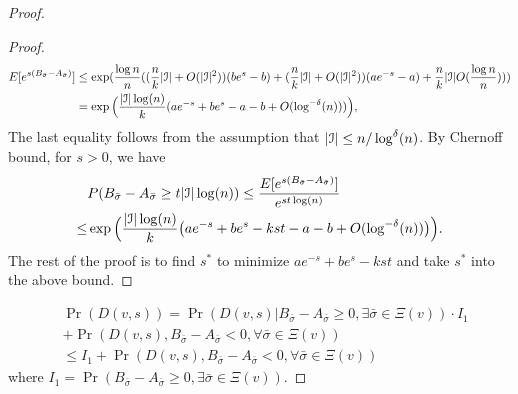 \documentclass{article}
\begin{document}
\begin{proof}
\begin{proof}
	\begin{align*}
	E[e^{s(B_{\bar{\sigma}}-A_{\bar{\sigma}})}] & \le
	\exp(\frac{\log n}{n}((\frac{n}{k}|\mathcal{I}| + O(|\mathcal{I}|^2))(be^s - b) +(\frac{n}{k} |\mathcal{I}| + O(|\mathcal{I}|^2))(ae^{-s}-a) + \frac{n}{k}|\mathcal{I}|O(\frac{\log n}{n}) ))
	 \\
	& =
	\exp\Big(\frac{|\mathcal{I}| \log(n)}{k}(a e^{-s}+b e^s-a-b +
	O(\log^{-\delta}(n))) \Big),
	\end{align*}
	The last equality follows from the assumption that $ |\mathcal{I}| \le n/\log^{\delta}(n)$.
	By Chernoff bound, for $s>0$, we have
	\begin{align*} 
	& P(B_{\bar{\sigma}}-A_{\bar{\sigma}}\ge t |\mathcal{I}| \log(n))\le
	\frac{E[e^{s(B_{\bar{\sigma}}-A_{\bar{\sigma}})}]}{e^{st \log(n)}}  \\
	\le & \exp\Big(\frac{|\mathcal{I}|\log(n)}{k} \big(a e^{-s}+b e^s -kst -a-b
	+ O(\log^{-\delta}(n)) \big)\Big)  .
	\end{align*}
	The rest of the proof is to find $s^\ast$ to minimize $a e^{-s}+b e^s -kst$ and take $s^\ast$ into the above bound. 
	\end{proof}
\begin{align*}
&\Pr(D(v,s)) = 
\Pr(D(v,s)| B_{\bar{\sigma}} - A_{\bar{\sigma}}   \geq 0, \exists \bar{\sigma} \in \Xi(v))
\cdot I_1 \\
&+ \Pr(D(v,s) , B_{\bar{\sigma}} - A_{\bar{\sigma}}  < 0, \forall   \bar{\sigma} \in \Xi(v))
 \\
& \leq I_1
+ \Pr(D(v,s), B_{\bar{\sigma}} - A_{\bar{\sigma}}    < 0, \forall \bar{\sigma} \in \Xi(v))
\end{align*}
where $I_1 = \Pr( B_{\bar{\sigma}} - A_{\bar{\sigma}}  \geq 0, \exists   \bar{\sigma} \in \Xi(v) )$.


\end{proof}
\end{document}
